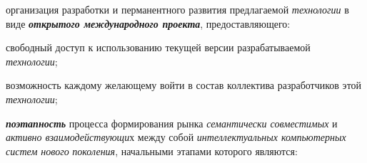 \begin{textitemize}
	\item
	организация разработки и перманентного развития предлагаемой \textit{технологии} в виде \textbf{\textit{открытого международного проекта}}, предоставляющего:
	\begin{textitemize}
		\item
		свободный доступ к использованию текущей версии разрабатываемой \textit{технологии};
		\item
		возможность каждому желающему войти в состав коллектива разработчиков этой \textit{технологии};
	\end{textitemize}
	
	\item
	\textbf{\textit{поэтапность}} процесса формирования рынка \textit{семантически совместимых} и \textit{активно взаимодействующи}х между собой \textit{интеллектуальных компьютерных систем нового} \textit{поколения}, начальными этапами которого являются:
	

\end{textitemize}
